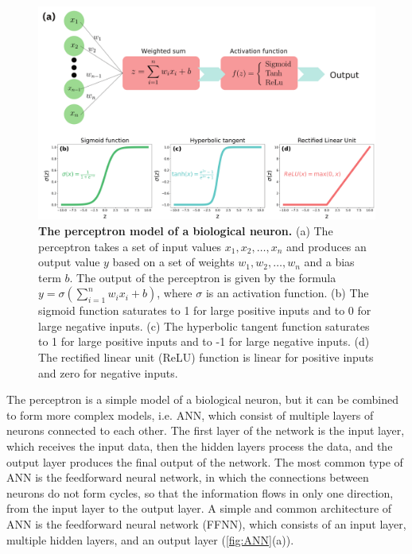 \begin{figure}[H]
  \centering
  \includegraphics[width=1\textwidth]{Figures/Perceptron.pdf}
  \caption[The perceptron model of a biological neuron]{
    \textbf{The perceptron model of a biological neuron.} (a) The perceptron
    takes a set of input values $x_1, x_2, \ldots, x_n$ and produces an output
    value $y$ based on a set of weights $w_1, w_2, \ldots, w_n$ and a bias term
    $b$. The output of the perceptron is given by the formula
    $y=\sigma(\sum_{i=1}^n w_ix_i + b)$, where $\sigma$ is an activation
    function. (b) The sigmoid function saturates to 1 for large positive inputs
    and to 0 for large negative inputs. (c) The hyperbolic tangent function
    saturates to 1 for large positive inputs and to -1 for large negative
    inputs. (d) The rectified linear unit (ReLU) function is linear for
    positive inputs and zero for negative inputs.}
  \label{fig:Perceptron}
\end{figure}

The perceptron is a simple model of a biological neuron, but it can be
combined to form more complex models, i.e. ANN, which consist of multiple
layers of neurons connected to each other. The first layer of the network is
the input layer, which receives the input data, then the hidden layers process
the data, and the output layer produces the final output of the network. The
most common type of ANN is the feedforward neural network, in which the
connections between neurons do not form cycles, so that the information flows
in only one direction, from the input layer to the output layer. A simple and
common architecture of ANN is the feedforward neural network (FFNN), which
consists of an input layer, multiple hidden layers, and an output layer
(\cref{fig:ANN}(a)).

